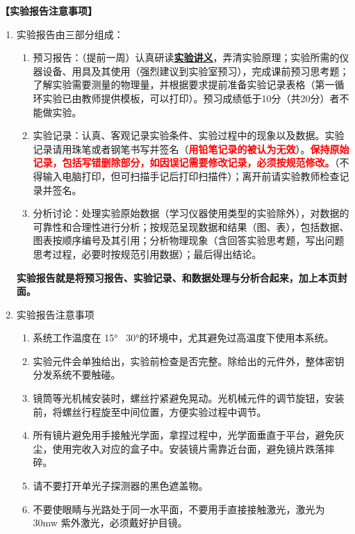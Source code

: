 \documentclass[dvipsnames, svgnames,a4paper,11pt]{article}
\begin{document}
\textbf{【实验报告注意事项】}
\begin{enumerate}
	\item 实验报告由三部分组成：
	\begin{enumerate}
		\item 预习报告：（提前一周）认真研读\underline{\textbf{实验讲义}}，弄清实验原理；实验所需的仪器设备、用具及其使用（强烈建议到实验室预习），完成课前预习思考题；了解实验需要测量的物理量，并根据要求提前准备实验记录表格（第一循环实验已由教师提供模板，可以打印）。预习成绩低于10分（共20分）者不能做实验。
	    \item 实验记录：认真、客观记录实验条件、实验过程中的现象以及数据。实验记录请用珠笔或者钢笔书写并签名（\textcolor{red}{\textbf{用铅笔记录的被认为无效}}）。\textcolor{red}{\textbf{保持原始记录，包括写错删除部分，如因误记需要修改记录，必须按规范修改。}}（不得输入电脑打印，但可扫描手记后打印扫描件）；离开前请实验教师检查记录并签名。
	    \item 分析讨论：处理实验原始数据（学习仪器使用类型的实验除外），对数据的可靠性和合理性进行分析；按规范呈现数据和结果（图、表），包括数据、图表按顺序编号及其引用；分析物理现象（含回答实验思考题，写出问题思考过程，必要时按规范引用数据）；最后得出结论。
	\end{enumerate}
	\textbf{实验报告就是将预习报告、实验记录、和数据处理与分析合起来，加上本页封面。}
	\item 实验报告注意事项
		\begin{enumerate}[label=\roman*.]
			\item 系统工作温度在 15°~ 30°的环境中，尤其避免过高温度下使用本系统。
			\item 实验元件会单独给出，实验前检查是否完整。除给出的元件外，整体密钥分发系统不要触碰。
			\item 镜筒等光机械安装时，螺丝拧紧避免晃动。光机械元件的调节旋钮，安装前，将螺丝行程旋至中间位置，方便实验过程中调节。
			\item 所有镜片避免用手接触光学面，拿捏过程中，光学面垂直于平台，避免灰尘，使用完收入对应的盒子中。安装镜片需靠近台面，避免镜片跌落摔碎。
			\item 请不要打开单光子探测器的黑色遮盖物。
			\item 不要使眼睛与光路处于同一水平面，不要用手直接接触激光，激光为 30mw 紫外激光，必须戴好护目镜。
		\end{enumerate}
\end{enumerate}


\clearpage
\tableofcontents
\clearpage
\end{document}
